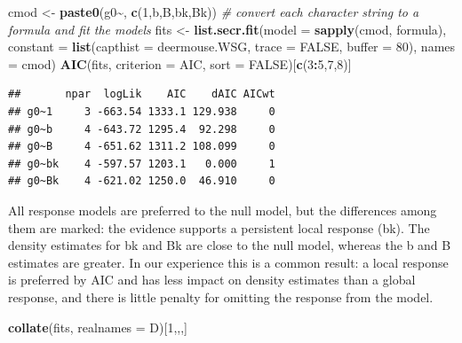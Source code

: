 \documentclass[
]{book}
\newenvironment{Shaded}{\begin{snugshade}}{\end{snugshade}}
\newcommand{\AttributeTok}[1]{\textcolor[rgb]{0.13,0.29,0.53}{#1}}
\newcommand{\CommentTok}[1]{\textcolor[rgb]{0.56,0.35,0.01}{\textit{#1}}}
\newcommand{\ConstantTok}[1]{\textcolor[rgb]{0.56,0.35,0.01}{#1}}
\newcommand{\DecValTok}[1]{\textcolor[rgb]{0.00,0.00,0.81}{#1}}
\newcommand{\FunctionTok}[1]{\textcolor[rgb]{0.13,0.29,0.53}{\textbf{#1}}}
\newcommand{\NormalTok}[1]{#1}
\newcommand{\OtherTok}[1]{\textcolor[rgb]{0.56,0.35,0.01}{#1}}
\newcommand{\SpecialCharTok}[1]{\textcolor[rgb]{0.81,0.36,0.00}{\textbf{#1}}}
\newcommand{\StringTok}[1]{\textcolor[rgb]{0.31,0.60,0.02}{#1}}
\begin{document}
\begin{Shaded}
\begin{Highlighting}[]
\NormalTok{cmod }\OtherTok{\textless{}{-}} \FunctionTok{paste0}\NormalTok{(}\StringTok{\textquotesingle{}g0\textasciitilde{}\textquotesingle{}}\NormalTok{, }\FunctionTok{c}\NormalTok{(}\StringTok{\textquotesingle{}1\textquotesingle{}}\NormalTok{,}\StringTok{\textquotesingle{}b\textquotesingle{}}\NormalTok{,}\StringTok{\textquotesingle{}B\textquotesingle{}}\NormalTok{,}\StringTok{\textquotesingle{}bk\textquotesingle{}}\NormalTok{,}\StringTok{\textquotesingle{}Bk\textquotesingle{}}\NormalTok{))}
\CommentTok{\# convert each character string to a formula and fit the models}
\NormalTok{fits }\OtherTok{\textless{}{-}} \FunctionTok{list.secr.fit}\NormalTok{(}\AttributeTok{model =} \FunctionTok{sapply}\NormalTok{(cmod, formula), }\AttributeTok{constant =} 
    \FunctionTok{list}\NormalTok{(}\AttributeTok{capthist =} \StringTok{\textquotesingle{}deermouse.WSG\textquotesingle{}}\NormalTok{, }\AttributeTok{trace =} \ConstantTok{FALSE}\NormalTok{, }\AttributeTok{buffer =} \DecValTok{80}\NormalTok{), }
    \AttributeTok{names =}\NormalTok{ cmod)}
\FunctionTok{AIC}\NormalTok{(fits, }\AttributeTok{criterion =} \StringTok{\textquotesingle{}AIC\textquotesingle{}}\NormalTok{, }\AttributeTok{sort =} \ConstantTok{FALSE}\NormalTok{)[}\FunctionTok{c}\NormalTok{(}\DecValTok{3}\SpecialCharTok{:}\DecValTok{5}\NormalTok{,}\DecValTok{7}\NormalTok{,}\DecValTok{8}\NormalTok{)]}
\end{Highlighting}
\end{Shaded}

\begin{verbatim}
##       npar  logLik    AIC    dAIC AICwt
## g0~1     3 -663.54 1333.1 129.938     0
## g0~b     4 -643.72 1295.4  92.298     0
## g0~B     4 -651.62 1311.2 108.099     0
## g0~bk    4 -597.57 1203.1   0.000     1
## g0~Bk    4 -621.02 1250.0  46.910     0
\end{verbatim}

All response models are preferred to the null model, but the differences among them are marked: the evidence supports a persistent local response (bk). The density estimates for bk and Bk are close to the null model, whereas the b and B estimates are greater. In our experience this is a common result: a local response is preferred by AIC and has less impact on density estimates than a global response, and there is little penalty for omitting the response from the model.

\begin{Shaded}
\begin{Highlighting}[]
\FunctionTok{collate}\NormalTok{(fits, }\AttributeTok{realnames =} \StringTok{\textquotesingle{}D\textquotesingle{}}\NormalTok{)[}\DecValTok{1}\NormalTok{,,,]}
\end{Highlighting}
\end{Shaded}
\end{document}
